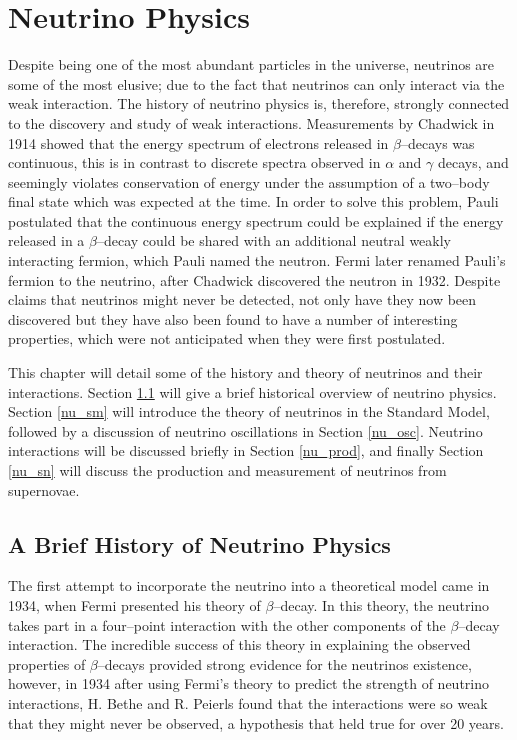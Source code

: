 \chapter{\label{ch:neutrinophysics}Neutrino Physics} 

\minitoc

Despite being one of the most abundant particles in the universe, neutrinos are 
some of the most elusive; due to the fact that neutrinos can only interact via
the weak interaction. The history of neutrino physics is, therefore, strongly
connected to the discovery and study of weak interactions. Measurements by
Chadwick in 1914 showed that the energy spectrum of electrons released in
$\beta$--decays was continuous, this is in contrast to discrete spectra
observed in $\alpha$ and $\gamma$ decays, and seemingly violates
conservation of energy under the assumption of a two--body final state which was
expected at the time. In order to solve this problem, Pauli postulated that the 
continuous energy spectrum could be explained if the energy released in a 
$\beta$--decay could be shared with an additional neutral weakly interacting 
fermion, which Pauli named the neutron. Fermi later renamed Pauli's fermion to 
the neutrino, after Chadwick discovered the neutron in 1932. Despite claims 
that neutrinos might never be detected, not only have they now been discovered
but they have also been found to have a number of interesting properties, which 
were not anticipated when they were first postulated. 

This chapter will detail some of the history and theory of neutrinos and their 
interactions. Section \ref{nu_hist} will give a brief historical overview of 
neutrino physics. Section \ref{nu_sm} will introduce the theory of neutrinos 
in the Standard Model, followed by a discussion of neutrino oscillations in 
Section \ref{nu_osc}. Neutrino interactions will be discussed briefly in 
Section \ref{nu_prod}, and finally Section \ref{nu_sn} will discuss the 
production and measurement of neutrinos from supernovae.

\section{A Brief History of Neutrino Physics} \label{nu_hist}

The first attempt to incorporate the neutrino into a theoretical model came in
1934, when Fermi presented his theory of \(\beta\)--decay. In this theory, the 
neutrino takes part in a four--point interaction with the other components of 
the \(\beta\)--decay interaction\cite{Fermi1934}. The incredible success of 
this theory in explaining the observed properties of \(\beta\)--decays 
provided strong evidence for the neutrinos existence, however, in 1934 after 
using Fermi's theory to predict the strength of neutrino interactions, H. 
Bethe and R. Peierls found that the interactions were so weak that they might 
never be observed, a hypothesis that held true for over 20 
years\cite{Bethe1934}.

